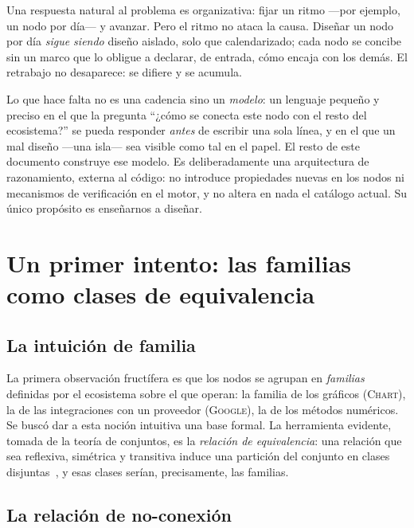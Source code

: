 \documentclass[11pt,a4paper]{article}
\theoremstyle{definition}
\theoremstyle{plain}
\newcommand{\mundo}[1]{\textsc{#1}}   %
\begin{document}
Una respuesta natural al problema es organizativa: fijar un ritmo ---por ejemplo, un
nodo por día--- y avanzar. Pero el ritmo no ataca la causa. Diseñar un nodo por día
\emph{sigue siendo} diseño aislado, solo que calendarizado; cada nodo se concibe
sin un marco que lo obligue a declarar, de entrada, cómo encaja con los demás. El
retrabajo no desaparece: se difiere y se acumula.

Lo que hace falta no es una cadencia sino un \emph{modelo}: un lenguaje pequeño y
preciso en el que la pregunta ``¿cómo se conecta este nodo con el resto del
ecosistema?'' se pueda responder \emph{antes} de escribir una sola línea, y en el
que un mal diseño ---una isla--- sea visible como tal en el papel. El resto de este
documento construye ese modelo. Es deliberadamente una arquitectura de
razonamiento, externa al código: no introduce propiedades nuevas en los nodos ni
mecanismos de verificación en el motor, y no altera en nada el catálogo actual. Su
único propósito es enseñarnos a diseñar.

\section{Un primer intento: las familias como clases de equivalencia}

\subsection{La intuición de familia}

La primera observación fructífera es que los nodos se agrupan en \emph{familias}
definidas por el ecosistema sobre el que operan: la familia de los gráficos
(\mundo{Chart}), la de las integraciones con un proveedor (\mundo{Google}), la de
los métodos numéricos. Se buscó dar a esta noción intuitiva una base formal. La
herramienta evidente, tomada de la teoría de conjuntos, es la \emph{relación de
equivalencia}: una relación que sea reflexiva, simétrica y transitiva induce una
partición del conjunto en clases disjuntas~\cite{hrbacek}, y esas clases serían,
precisamente, las familias.

\subsection{La relación de no-conexión}
\end{document}
